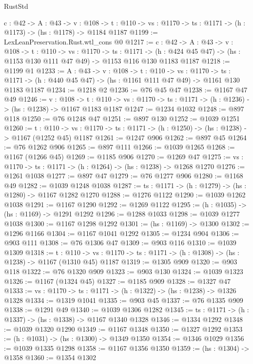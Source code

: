 \begin{lexlean}{RustStd}
\begin{coremodule}
  {c : @42} ->
  {A : @43} ->
  {v : @108} ->
  {t : @110} -> {vs : @1170} -> {ts : @1171} -> (h : @1173) -> (hs : @1178) -> @1184 @1187
@1199 := LexLeanPreservation.Rust.wtl_cons @0
@1217 := {c : @42} ->
  {A : @43} ->
  {v : @108} ->
  {t : @110} ->
  {vs : @1170} ->
  {ts : @1171} ->
  (h : @424 @45 @47) -> (hs : @1153 @130 @111 @47 @49) -> @1153 @116 @130 @1183 @1187
@1218 := @1199 @1
@1233 := {A : @43} ->
  {v : @108} ->
  {t : @110} ->
  {vs : @1170} ->
  {ts : @1171} -> (h : @440 @45 @47) -> (hs : @1161 @111 @47 @49) -> @1161 @130 @1183 @1187
@1234 := @1218 @2
@1236 := @76 @45 @47
@1238 := @1167 @47 @49
@1246 := {v : @108} ->
  {t : @110} -> {vs : @1170} -> {ts : @1171} -> (h : @1236) -> (hs : @1238) -> @1167 @1183 @1187
@1247 := @1234 @1032
@1248 := @897 @118
@1250 := @76 @1248 @47
@1251 := @897 @130
@1252 := @1039 @1251
@1260 := {t : @110} ->
  {vs : @1170} -> {ts : @1171} -> (h : @1250) -> (hs : @1238) -> @1167 (@1252 @45) @1187
@1261 := @1247 @906
@1262 := @897 @45
@1264 := @76 @1262 @906
@1265 := @897 @111
@1266 := @1039 @1265
@1268 := @1167 (@1266 @45)
@1269 := @1185 @906
@1270 := @1269 @47
@1275 := {vs : @1170} -> {ts : @1171} -> (h : @1264) -> (hs : @1238) -> @1268 @1270
@1276 := @1261 @1038
@1277 := @897 @47
@1279 := @76 @1277 @906
@1280 := @1168 @49
@1282 := @1039 @1248 @1038
@1287 := {ts : @1171} -> (h : @1279) -> (hs : @1280) -> @1167 @1282 @1270
@1288 := @1276 @1122
@1290 := @1039 @1262 @1038
@1291 := @1167 @1290
@1292 := @1269 @1122
@1295 := (h : @1035) -> (hs : @1169) -> @1291 @1292
@1296 := @1288 @1033
@1298 := @1039 @1277 @1038
@1300 := @1167 @1298 @1292
@1301 := (hs : @1169) -> @1300
@1302 := @1296 @1166
@1304 := @1167 @1041 @1292
@1305 := @1234 @904
@1306 := @903 @111
@1308 := @76 @1306 @47
@1309 := @903 @116
@1310 := @1039 @1309
@1318 := {t : @110} ->
  {vs : @1170} -> {ts : @1171} -> (h : @1308) -> (hs : @1238) -> @1167 (@1310 @45) @1187
@1319 := @1305 @909
@1320 := @903 @118
@1322 := @76 @1320 @909
@1323 := @903 @130
@1324 := @1039 @1323
@1326 := @1167 (@1324 @45)
@1327 := @1185 @909
@1328 := @1327 @47
@1333 := {vs : @1170} -> {ts : @1171} -> (h : @1322) -> (hs : @1238) -> @1326 @1328
@1334 := @1319 @1041
@1335 := @903 @45
@1337 := @76 @1335 @909
@1338 := @1291 @49
@1340 := @1039 @1306 @1282
@1345 := {ts : @1171} -> (h : @1337) -> (hs : @1338) -> @1167 @1340 @1328
@1346 := @1334 @1292
@1348 := @1039 @1320 @1290
@1349 := @1167 @1348
@1350 := @1327 @1292
@1353 := (h : @1031) -> (hs : @1300) -> @1349 @1350
@1354 := @1346 @1029
@1356 := @1039 @1335 @1298
@1358 := @1167 @1356 @1350
@1359 := (hs : @1304) -> @1358
@1360 := @1354 @1302

\end{coremodule}
\end{lexlean}
